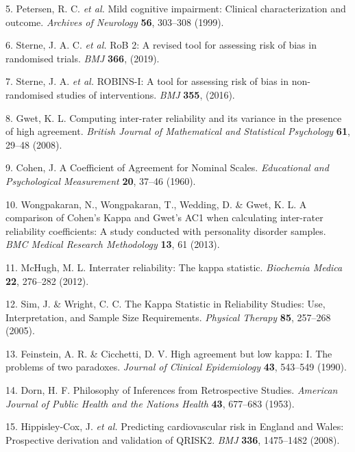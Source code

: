 \documentclass[a4paper, nobind]{templates/ociamthesis}
\begin{document}
\leavevmode\hypertarget{ref-petersen1999}{}%
5. Petersen, R. C. \emph{et al.} Mild cognitive impairment: Clinical characterization and outcome. \emph{Archives of Neurology} \textbf{56}, 303--308 (1999).

\leavevmode\hypertarget{ref-sterne2019}{}%
6. Sterne, J. A. C. \emph{et al.} RoB 2: A revised tool for assessing risk of bias in randomised trials. \emph{BMJ} \textbf{366}, (2019).

\leavevmode\hypertarget{ref-sterne2016}{}%
7. Sterne, J. A. \emph{et al.} ROBINS-I: A tool for assessing risk of bias in non-randomised studies of interventions. \emph{BMJ} \textbf{355}, (2016).

\leavevmode\hypertarget{ref-gwet2008}{}%
8. Gwet, K. L. Computing inter-rater reliability and its variance in the presence of high agreement. \emph{British Journal of Mathematical and Statistical Psychology} \textbf{61}, 29--48 (2008).

\leavevmode\hypertarget{ref-cohen1960}{}%
9. Cohen, J. A Coefficient of Agreement for Nominal Scales. \emph{Educational and Psychological Measurement} \textbf{20}, 37--46 (1960).

\leavevmode\hypertarget{ref-wongpakaran2013}{}%
10. Wongpakaran, N., Wongpakaran, T., Wedding, D. \& Gwet, K. L. A comparison of Cohen's Kappa and Gwet's AC1 when calculating inter-rater reliability coefficients: A study conducted with personality disorder samples. \emph{BMC Medical Research Methodology} \textbf{13}, 61 (2013).

\leavevmode\hypertarget{ref-mchugh2012}{}%
11. McHugh, M. L. Interrater reliability: The kappa statistic. \emph{Biochemia Medica} \textbf{22}, 276--282 (2012).

\leavevmode\hypertarget{ref-sim2005}{}%
12. Sim, J. \& Wright, C. C. The Kappa Statistic in Reliability Studies: Use, Interpretation, and Sample Size Requirements. \emph{Physical Therapy} \textbf{85}, 257--268 (2005).

\leavevmode\hypertarget{ref-feinstein1990}{}%
13. Feinstein, A. R. \& Cicchetti, D. V. High agreement but low kappa: I. The problems of two paradoxes. \emph{Journal of Clinical Epidemiology} \textbf{43}, 543--549 (1990).

\leavevmode\hypertarget{ref-dorn1953}{}%
14. Dorn, H. F. Philosophy of Inferences from Retrospective Studies. \emph{American Journal of Public Health and the Nations Health} \textbf{43}, 677--683 (1953).

\leavevmode\hypertarget{ref-hippisley-cox2008}{}%
15. Hippisley-Cox, J. \emph{et al.} Predicting cardiovascular risk in England and Wales: Prospective derivation and validation of QRISK2. \emph{BMJ} \textbf{336}, 1475--1482 (2008).
\end{document}

